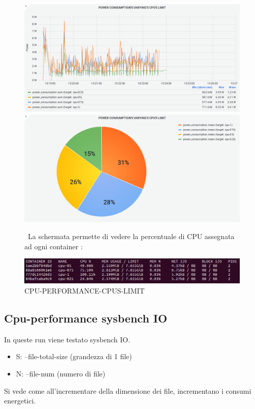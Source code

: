\documentclass[a4paper, 11pt]{article}
\begin{document}
\begin{figure}[h]
\caption{CPU-PERFORMANCE-CPUS-LIMIT}
\centering
\includegraphics[scale=0.4]{image30}
\includegraphics[scale=0.4]{image35}
\begin{flushleft}
{\ La schermata permette di vedere la percentuale di CPU assegnata ad ogni container : }
\end{flushleft}
\includegraphics[scale=0.4]{cpus}

\end{figure}
\begin{flushleft}

\end{flushleft}
\clearpage
\subsection{Cpu-performance sysbench IO}
\begin{flushleft}
In queste run viene testato sysbench IO.
\begin{itemize}
\item S: --file-total-size (grandezza di 1 file)
\item N: --file-num (numero di file)
\end{itemize}
\end{flushleft}
\begin{flushleft}
Si vede come all'incrementare della dimensione dei file, incrementano i consumi energetici.
\end{flushleft}
\end{document}
